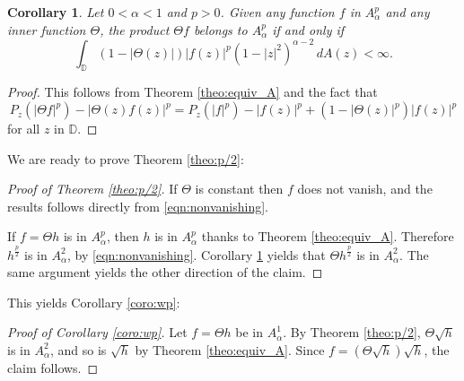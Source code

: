 \documentclass[12pt]{amsart}
\newtheorem{corollary}[theorem]{Corollary}
\theoremstyle{definition}
\newcommand{\D}{\mathbb{{D}}}
\numberwithin{equation}{section}
\begin{document}
        \begin{corollary}
        \label{coro:inner_outer}
            Let $0<\alpha<1$ and $p>0$. Given any function $f$ in $A^p_\alpha$ and any inner function $\Theta$, the product $\Theta f$ belongs to $A^p_\alpha$ if and only if
            \[
                \int_{\D}(1-|\Theta(z)|)|f(z)|^p(1-|z|^2)^{\alpha-2}\,dA(z)<\infty.
            \]
        \end{corollary}
        
        \begin{proof}
            This follows from Theorem \ref{theo:equiv_A} and the fact that 
            \[
                P_z(|\Theta f|^p)-|\Theta(z)f(z)|^p=P_z(|f|^p)-|f(z)|^p+(1-|\Theta(z)|^p)|f(z)|^p
            \]
            for all $z$ in $\D$.
        \end{proof}

        We are ready to prove Theorem \ref{theo:p/2}:
        
        \begin{proof}[Proof of Theorem \ref{theo:p/2}]
            If $\Theta$ is constant then $f$ does not vanish, and the results follows directly from \eqref{eqn:nonvanishing}.
        
            If $f=\Theta h$ is in $A^p_\alpha$, then $h$ is in $A^p_\alpha$ thanks to Theorem \ref{theo:equiv_A}. Therefore $h^\frac{p}{2}$ is in $A^2_{\alpha}$, by \eqref{eqn:nonvanishing}. Corollary \ref{coro:inner_outer} yields that $\Theta h^\frac{p}{2}$ is in $A^2_{\alpha}$. The same argument yields the other direction of the claim.
        \end{proof}

        This yields Corollary \ref{coro:wp}:
        
        \begin{proof}[Proof of Corollary \ref{coro:wp}]
            Let $f=\Theta h$ be in $A^1_\alpha$. By Theorem \ref{theo:p/2}, $\Theta\sqrt h$ is in $A^2_\alpha$, and so is $\sqrt{h}$ by Theorem \ref{theo:equiv_A}. Since $f=(\Theta\sqrt h)\sqrt h$, the claim follows.
        \end{proof}
\end{document}
